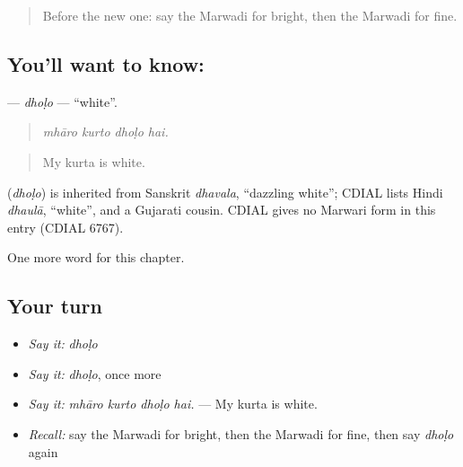 \label{lesson:MW-C229-dholo}



\begin{quote}
Before the new one: say the Marwadi for bright, then the Marwadi for fine.
\end{quote}

\subsection*{You'll want to know: }
\textbf{} — \emph{dhoḷo} — \textquotedblleft{}white\textquotedblright{}.

\begin{quote}
   
\end{quote}

\begin{quote}
\emph{mhāro kurto dhoḷo hai.}
\end{quote}

\begin{quote}
My kurta is white.
\end{quote}

\begin{cousinweb}
\textbf{} (\emph{dhoḷo}) is inherited from Sanskrit \emph{dhavala}, \textquotedblleft{}dazzling white\textquotedblright{}; CDIAL lists Hindi \emph{dhaulā}, \textquotedblleft{}white\textquotedblright{}, and a Gujarati cousin. CDIAL gives no Marwari form in this entry (CDIAL 6767).
\end{cousinweb}

\begin{grammarlens}[title={What you've built}]
One more word for this chapter.
\end{grammarlens}

\subsection*{Your turn}
\begin{itemize}
\raggedright
  \item \emph{Say it:} \emph{dhoḷo}
  \item \emph{Say it:} \emph{dhoḷo}, once more
  \item \emph{Say it:} \emph{mhāro kurto dhoḷo hai.} — My kurta is white.
  \item \emph{Recall:} say the Marwadi for bright, then the Marwadi for fine, then say \emph{dhoḷo} again
\end{itemize}

